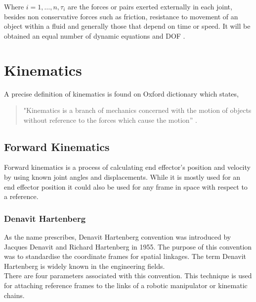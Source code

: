 \documentclass{UoNMCHA}
\numberwithin{equation}{section}
\begin{document}
	
	Where $i=1,\ldots,n,\tau_i$ are the forces or pairs exerted externally in each joint, besides non conservative forces such as friction, resistance to movement of an object within a fluid and generally those that depend on time or speed. It will be obtained an equal number of dynamic equations and DOF \cite{duartemadrid_2017_dynamic}.
	
	\section{Kinematics}
	
	A precise definition of kinematics is found on Oxford dictionary which states, \begin{quote}
		"Kinematics is a branch of mechanics concerned with the motion of objects without reference to the forces which cause the motion” \cite{kinematics}.
	\end{quote} 
	
	\subsection{Forward Kinematics}
	
	Forward kinematics is a process of calculating end effector’s position and velocity by using known joint angles and displacements. While it is mostly used for an end effector position it could also be used for any frame in space with respect to a reference.
	
	\subsubsection{Denavit Hartenberg}
	As the name prescribes, Denavit Hartenberg convention was introduced by Jacques Denavit and Richard Hartenberg in 1955. The purpose of this convention was to standardise the coordinate frames for spatial linkages. The term Denavit Hartenberg is widely known in the engineering fields. \\
	
	\newpage
	There are four parameters associated with this convention. This technique is used for attaching reference frames to the links of a robotic manipulator or kinematic chains.
	
\end{document}
